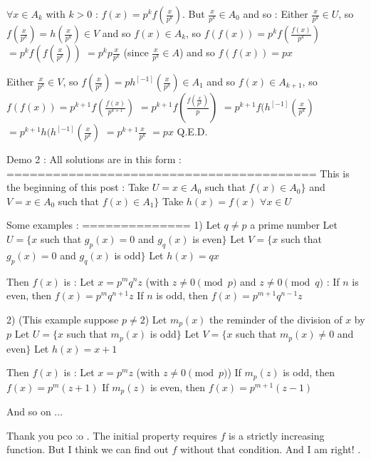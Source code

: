 \begin{solution}
$ \forall x\in A_k$ with $ k > 0$ : $ f(x) = p^kf(\frac {x}{p^k})$. But $ \frac {x}{p^k}\in A_0$ and so :
Either $ \frac {x}{p^k}\in U$, so $ f(\frac {x}{p^k}) = h(\frac {x}{p^k})\in V$ and so $ f(x)\in A_k$, so $ f(f(x)) = p^kf(\frac {f(x)}{p^k})$ $ = p^kf(f(\frac {x}{p^k}))$ $ = p^kp\frac {x}{p^k}$ (since $ \frac {x}{p^k}\in A$) and so $ f(f(x)) = px$

Either $ \frac {x}{p^k}\in V$, so $ f(\frac {x}{p^k}) = ph^{[ - 1]}(\frac {x}{p^k})\in A_1$ and so $ f(x)\in A_{k + 1}$, so $ f(f(x)) = p^{k + 1}f(\frac {f(x)}{p^{k + 1}})$ $ = p^{k + 1}f(\frac {f(\frac {x}{p^k})}{p})$ $ = p^{k + 1}f(h^{[ - 1]}(\frac {x}{p^k})$ $ = p^{k + 1}h(h^{[ - 1]}(\frac {x}{p^k})$ $ = p^{k + 1}\frac {x}{p^k}$ $ = px$
Q.E.D.

Demo 2 : All solutions are in this form :
========================================
This is the beginning of this post :
Take $ U = {x\in A_0}$ such that $ f(x)\in A_0\}$ and $ V = {x\in A_0}$ such that $ f(x)\in A_1\}$
Take $ h(x) = f(x)$ $ \forall x\in U$

Some examples :
==============
1) 
Let $ q\neq p$ a prime number
Let $ U = \{x$ such that $ g_p(x) = 0$ and $ g_q(x)$ is even$ \}$
Let $ V = \{x$ such that $ g_p(x) = 0$ and $ g_q(x)$ is odd$ \}$
Let $ h(x) = qx$

Then $ f(x)$ is :
Let $ x = p^mq^nz$ (with $ z\neq 0\pmod p$ and $ z\neq 0\pmod q$ :
If $ n$ is even, then $ f(x) = p^mq^{n + 1}z$
If $ n$ is odd, then $ f(x) = p^{m + 1}q^{n - 1}z$

2)
(This example suppose $ p\neq 2$)
Let $ m_p(x)$ the reminder of the division of $ x$ by $ p$
Let $ U = \{x$ such that $ m_p(x)$ is odd$ \}$
Let $ V = \{x$ such that $ m_p(x)\neq 0$ and even$ \}$
Let $ h(x) = x + 1$

Then $ f(x)$ is :
Let $ x = p^mz$ (with $ z\neq 0\pmod p$)
If $ m_p(z)$ is odd, then $ f(x) = p^m(z + 1)$
If $ m_p(z)$ is even, then $ f(x) = p^{m + 1}(z - 1)$

 And so on ...
\end{solution}



\begin{solution}
	Thank you pco  :o . The initial property requires $ f$ is a strictly increasing function. But I think we can find out $ f$ without that condition. And  I am right!   .
\end{solution}



